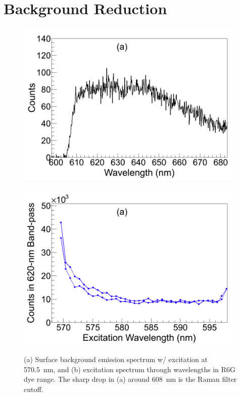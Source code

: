 
\section{Background Reduction}
\label{sec:bgs}

\begin{figure} %
        \centering
                \includegraphics[width=.5\textwidth]{figures/surfaceBG_a.png}
                ~
                \includegraphics[width=.5\textwidth]{figures/surfaceBG_b.png}
                \caption{(a) Surface background emission spectrum w/ excitation at 570.5~nm, and (b) excitation spectrum through wavelengths in R6G dye range.  The sharp drop in (a) around 608~nm is the Raman filter cutoff.}
\label{fig:surfBG}
\end{figure}

